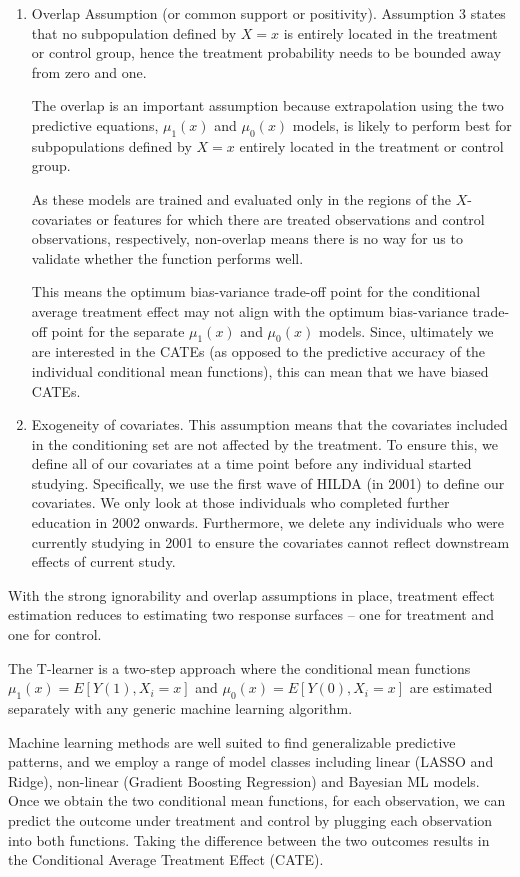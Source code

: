 \documentclass[12pt, a4paper]{article}
\begin{document}
\begin{enumerate}
  \item Overlap Assumption (or common support or positivity). Assumption 3 states that no subpopulation defined by $X = x$ is entirely located in the treatment or control group, hence the treatment probability needs to be bounded away from zero and one.
  
The overlap is an important assumption because extrapolation using the two predictive equations, $\mu _1(x)$ and $\mu _0(x)$ models, is likely to perform best for subpopulations defined by $X = x$ entirely located in the treatment or control group. 

As these models are trained and evaluated only in the regions of the $X$-covariates or features for which there are treated observations and control observations, respectively, non-overlap means there is no way for us to validate whether the function performs well.  

This means the optimum bias-variance trade-off point for the conditional average treatment effect may not align with the optimum bias-variance trade-off point for the separate $\mu _1(x)$ and $\mu _0(x)$ models. Since, ultimately we are interested in the CATEs (as opposed to the predictive accuracy of the individual conditional mean functions), this can mean that we have biased CATEs.


  \item Exogeneity of covariates. This assumption means that the covariates included in the conditioning set are not affected by the treatment. To ensure this, we define all of our covariates at a time point before any individual started studying. Specifically, we use the first wave of HILDA (in 2001) to define our covariates. We only look at those individuals who completed further education in 2002 onwards. Furthermore, we delete any individuals who were currently studying in 2001 to ensure the covariates cannot reflect downstream effects of current study. 

\end{enumerate}

With the strong ignorability and overlap assumptions in place, treatment effect estimation reduces to estimating two response surfaces – one for treatment and one for control.

The T-learner is a two-step approach where the conditional mean functions $\mu_1(x) = E[Y(1), X_i = x]$ and $\mu _0(x) = E[Y(0), X_i = x]$  are estimated separately with any generic machine learning algorithm.

Machine learning methods are well suited to find generalizable predictive patterns, and we employ a range of model classes including linear (LASSO and Ridge), non-linear (Gradient Boosting Regression) and Bayesian ML models. Once we obtain the two conditional mean functions, for each observation, we can predict the outcome under treatment and control by plugging each observation into both functions. Taking the difference between the two outcomes results in the Conditional Average Treatment Effect (CATE).
\end{document}
